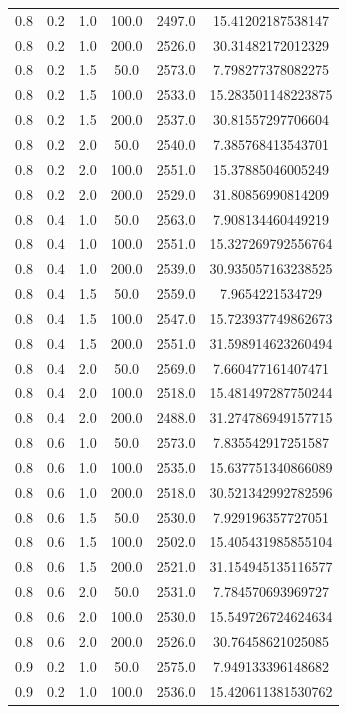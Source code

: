 \begin{tabular}{cccccc}
0.8 & 0.2 & 1.0 & 100.0 & 2497.0 & 15.41202187538147 \\
0.8 & 0.2 & 1.0 & 200.0 & 2526.0 & 30.31482172012329 \\
0.8 & 0.2 & 1.5 & 50.0 & 2573.0 & 7.798277378082275 \\
0.8 & 0.2 & 1.5 & 100.0 & 2533.0 & 15.283501148223875 \\
0.8 & 0.2 & 1.5 & 200.0 & 2537.0 & 30.81557297706604 \\
0.8 & 0.2 & 2.0 & 50.0 & 2540.0 & 7.385768413543701 \\
0.8 & 0.2 & 2.0 & 100.0 & 2551.0 & 15.37885046005249 \\
0.8 & 0.2 & 2.0 & 200.0 & 2529.0 & 31.80856990814209 \\
0.8 & 0.4 & 1.0 & 50.0 & 2563.0 & 7.908134460449219 \\
0.8 & 0.4 & 1.0 & 100.0 & 2551.0 & 15.327269792556764 \\
0.8 & 0.4 & 1.0 & 200.0 & 2539.0 & 30.935057163238525 \\
0.8 & 0.4 & 1.5 & 50.0 & 2559.0 & 7.9654221534729 \\
0.8 & 0.4 & 1.5 & 100.0 & 2547.0 & 15.723937749862673 \\
0.8 & 0.4 & 1.5 & 200.0 & 2551.0 & 31.598914623260494 \\
0.8 & 0.4 & 2.0 & 50.0 & 2569.0 & 7.660477161407471 \\
0.8 & 0.4 & 2.0 & 100.0 & 2518.0 & 15.481497287750244 \\
0.8 & 0.4 & 2.0 & 200.0 & 2488.0 & 31.274786949157715 \\
0.8 & 0.6 & 1.0 & 50.0 & 2573.0 & 7.835542917251587 \\
0.8 & 0.6 & 1.0 & 100.0 & 2535.0 & 15.637751340866089 \\
0.8 & 0.6 & 1.0 & 200.0 & 2518.0 & 30.521342992782596 \\
0.8 & 0.6 & 1.5 & 50.0 & 2530.0 & 7.929196357727051 \\
0.8 & 0.6 & 1.5 & 100.0 & 2502.0 & 15.405431985855104 \\
0.8 & 0.6 & 1.5 & 200.0 & 2521.0 & 31.154945135116577 \\
0.8 & 0.6 & 2.0 & 50.0 & 2531.0 & 7.784570693969727 \\
0.8 & 0.6 & 2.0 & 100.0 & 2530.0 & 15.549726724624634 \\
0.8 & 0.6 & 2.0 & 200.0 & 2526.0 & 30.76458621025085 \\
0.9 & 0.2 & 1.0 & 50.0 & 2575.0 & 7.949133396148682 \\
0.9 & 0.2 & 1.0 & 100.0 & 2536.0 & 15.420611381530762 \\

\end{tabular}
